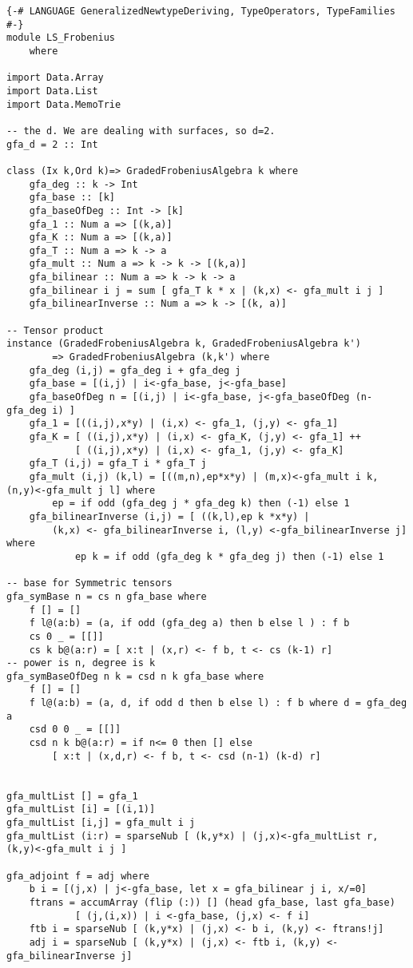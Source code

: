 \begin{lstlisting}
{-# LANGUAGE GeneralizedNewtypeDeriving, TypeOperators, TypeFamilies #-}
module LS_Frobenius 
	where

import Data.Array
import Data.List
import Data.MemoTrie

-- the d. We are dealing with surfaces, so d=2.
gfa_d = 2 :: Int

class (Ix k,Ord k)=> GradedFrobeniusAlgebra k where
	gfa_deg :: k -> Int
	gfa_base :: [k]
	gfa_baseOfDeg :: Int -> [k]
	gfa_1 :: Num a => [(k,a)]
	gfa_K :: Num a => [(k,a)]
	gfa_T :: Num a => k -> a
	gfa_mult :: Num a => k -> k -> [(k,a)]
	gfa_bilinear :: Num a => k -> k -> a
	gfa_bilinear i j = sum [ gfa_T k * x | (k,x) <- gfa_mult i j ]
	gfa_bilinearInverse :: Num a => k -> [(k, a)]

-- Tensor product
instance (GradedFrobeniusAlgebra k, GradedFrobeniusAlgebra k') 
		=> GradedFrobeniusAlgebra (k,k') where
	gfa_deg (i,j) = gfa_deg i + gfa_deg j
	gfa_base = [(i,j) | i<-gfa_base, j<-gfa_base]
	gfa_baseOfDeg n = [(i,j) | i<-gfa_base, j<-gfa_baseOfDeg (n-gfa_deg i) ]
	gfa_1 = [((i,j),x*y) | (i,x) <- gfa_1, (j,y) <- gfa_1]
	gfa_K = [ ((i,j),x*y) | (i,x) <- gfa_K, (j,y) <- gfa_1] ++ 
			[ ((i,j),x*y) | (i,x) <- gfa_1, (j,y) <- gfa_K] 
	gfa_T (i,j) = gfa_T i * gfa_T j
	gfa_mult (i,j) (k,l) = [((m,n),ep*x*y) | (m,x)<-gfa_mult i k, (n,y)<-gfa_mult j l] where
		ep = if odd (gfa_deg j * gfa_deg k) then (-1) else 1
	gfa_bilinearInverse (i,j) = [ ((k,l),ep k *x*y) | 
		(k,x) <- gfa_bilinearInverse i, (l,y) <-gfa_bilinearInverse j] where
			ep k = if odd (gfa_deg k * gfa_deg j) then (-1) else 1

-- base for Symmetric tensors
gfa_symBase n = cs n gfa_base where
	f [] = []
	f l@(a:b) = (a, if odd (gfa_deg a) then b else l ) : f b
	cs 0 _ = [[]]
	cs k b@(a:r) = [ x:t | (x,r) <- f b, t <- cs (k-1) r] 
-- power is n, degree is k
gfa_symBaseOfDeg n k = csd n k gfa_base where
	f [] = []
	f l@(a:b) = (a, d, if odd d then b else l) : f b where d = gfa_deg a
	csd 0 0 _ = [[]]
	csd n k b@(a:r) = if n<= 0 then [] else
		[ x:t | (x,d,r) <- f b, t <- csd (n-1) (k-d) r] 
	
	
gfa_multList [] = gfa_1
gfa_multList [i] = [(i,1)]
gfa_multList [i,j] = gfa_mult i j
gfa_multList (i:r) = sparseNub [ (k,y*x) | (j,x)<-gfa_multList r, (k,y)<-gfa_mult i j ]

gfa_adjoint f = adj where
	b i = [(j,x) | j<-gfa_base, let x = gfa_bilinear j i, x/=0]
	ftrans = accumArray (flip (:)) [] (head gfa_base, last gfa_base)
			[ (j,(i,x)) | i <-gfa_base, (j,x) <- f i] 
	ftb i = sparseNub [ (k,y*x) | (j,x) <- b i, (k,y) <- ftrans!j]
	adj i = sparseNub [ (k,y*x) | (j,x) <- ftb i, (k,y) <- gfa_bilinearInverse j]


\end{lstlisting}

